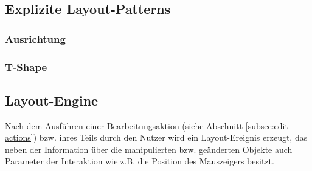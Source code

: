 \subsection{Explizite Layout-Patterns}


\subsubsection{Ausrichtung}


\subsubsection{T-Shape}






\subsection{Layout-Engine}

Nach dem Ausführen einer Bearbeitungsaktion (siehe Abschnitt \ref{subsec:edit-actions}) bzw. ihres Teils durch den Nutzer wird ein Layout-Ereignis erzeugt, das neben der Information über die manipulierten bzw. geänderten Objekte auch Parameter der Interaktion wie z.B. die Position des Mauszeigers besitzt.









